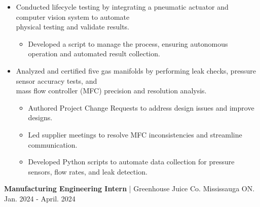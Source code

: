 \documentclass{article}
\begin{document}
\vspace{-0.2cm}
\begin{itemize}[leftmargin=1.5cm]

    \item {Conducted lifecycle testing by integrating a pneumatic actuator and computer vision system to automate \\ physical testing and validate results.
    \vspace{-0.2cm}
    \begin{itemize} [label=$\circ$, leftmargin=0.5cm]
        \item {Developed a script to manage the process, ensuring autonomous operation and automated result collection.}
    \end{itemize}
    }


    \vspace{-0.2cm}
    \item Analyzed and certified five gas manifolds by performing leak checks, pressure sensor accuracy tests, and \\ mass flow controller (MFC)  precision and resolution analysis.
    \vspace{-0.2cm}
    \begin{itemize} [label=$\circ$, leftmargin=0.5cm]
        \item Authored Project Change Requests to address design issues and improve designs.
        \item Led supplier meetings to resolve MFC inconsistencies and streamline communication.
        \item Developed Python scripts to automate data collection for pressure sensors, flow rates, and leak detection.

    \end{itemize}
        
    

    
\end{itemize}


\textbf{\hspace{-0.10cm} Manufacturing Engineering Intern} | Greenhouse Juice Co. Mississauga ON. \hspace{2.2cm} {\small Jan. 2024 - April. 2024}
\end{document}

